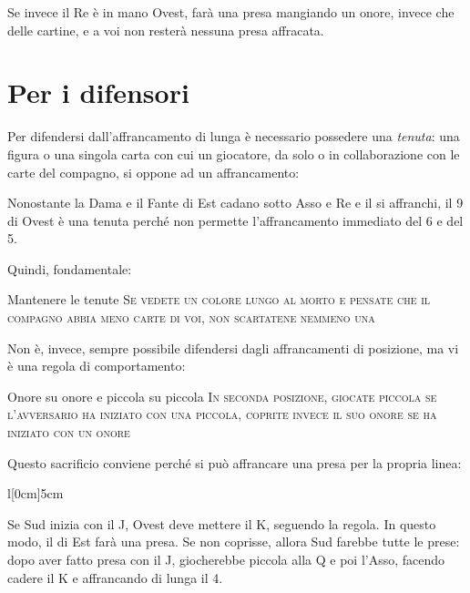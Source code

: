 \documentclass[../corsofiori.tex]{subfiles}
\begin{document}
Se invece il Re è in mano Ovest, farà una presa
mangiando un onore, invece che delle cartine, e a voi non resterà nessuna presa affracata.

\section{Per i difensori}

Per difendersi dall'affrancamento di lunga è necessario possedere una \emph{tenuta}: una figura o una singola carta con cui un giocatore, da solo o in
collaborazione con le carte del compagno, si oppone ad un affrancamento:
\newpage


Nonostante la Dama e il Fante di Est cadano sotto Asso e Re e il \Ten si affranchi, il 9 di Ovest è una tenuta perché
non permette l'affrancamento immediato del 6 e del 5.

Quindi, fondamentale:

\medskip

\begin{regola}{Mantenere le tenute}
    \textsc{Se vedete un colore lungo al morto e pensate che il compagno abbia meno carte di voi, non scartatene nemmeno una}
\end{regola}
\medskip

Non è, invece, sempre possibile difendersi dagli affrancamenti di posizione, ma vi è una regola di comportamento:

\medskip

\begin{regola}{Onore su onore e piccola su piccola}
    \textsc{In seconda posizione, giocate piccola se l'avversario ha iniziato con una piccola, coprite invece il suo
        onore se ha iniziato con un onore}
\end{regola}

\medskip

Questo sacrificio conviene perché si può affrancare una presa per la propria linea:

\begin{wraptable}[7]{l}[0cm]{5cm}
\end{wraptable}

Se Sud inizia con il J, Ovest deve mettere il K, seguendo la regola. In questo modo, il \Ten di Est farà una presa. Se
non coprisse, allora Sud farebbe tutte le prese: dopo aver fatto presa con il J, giocherebbe piccola alla Q e poi
l'Asso, facendo cadere il K e affrancando di lunga il 4.
\end{document}
